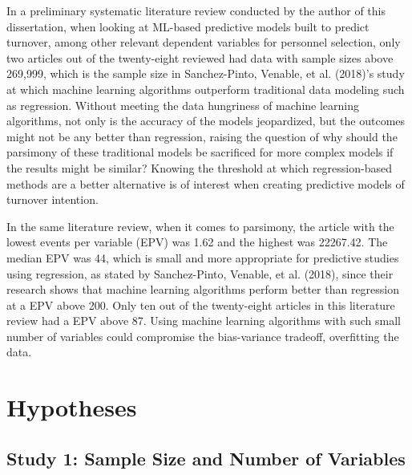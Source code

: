 \documentclass[
  man]{apa7}
\begin{document}
In a preliminary systematic literature review conducted by the author of this dissertation, when looking at ML-based predictive models built to predict turnover, among other relevant dependent variables for personnel selection, only two articles out of the twenty-eight reviewed had data with sample sizes above 269,999, which is the sample size in Sanchez-Pinto, Venable, et al. (2018)'s study at which machine learning algorithms outperform traditional data modeling such as regression.
Without meeting the data hungriness of machine learning algorithms, not only is the accuracy of the models jeopardized, but the outcomes might not be any better than regression, raising the question of why should the parsimony of these traditional models be sacrificed for more complex models if the results might be similar? Knowing the threshold at which regression-based methods are a better alternative is of interest when creating predictive models of turnover intention.

In the same literature review, when it comes to parsimony, the article with the lowest events per variable (EPV) was 1.62 and the highest was 22267.42.
The median EPV was 44, which is small and more appropriate for predictive studies using regression, as stated by Sanchez-Pinto, Venable, et al. (2018), since their research shows that machine learning algorithms perform better than regression at a EPV above 200.
Only ten out of the twenty-eight articles in this literature review had a EPV above 87.
Using machine learning algorithms with such small number of variables could compromise the bias-variance tradeoff, overfitting the data.

\section{Hypotheses}\label{hypotheses}

\subsection{Study 1: Sample Size and Number of Variables}\label{study-1-sample-size-and-number-of-variables}
\end{document}
